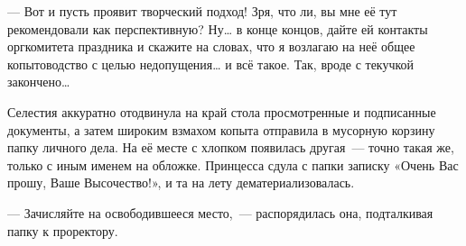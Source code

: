 \documentclass[fontsize=11pt,a5paper,titlepage=firstcover]{scrbook}
\begin{document}
--- Вот и пусть проявит творческий подход! Зря, что ли, вы мне её тут рекомендовали как перспективную? Ну{\ldots} в конце концов, дайте ей контакты оргкомитета праздника и скажите на словах, что я возлагаю на неё общее копытоводство с целью недопущения{\ldots} и всё такое. Так, вроде с текучкой закончено{\ldots}

Селестия аккуратно отодвинула на край стола просмотренные и подписанные документы, а затем широким взмахом копыта отправила в мусорную корзину папку личного дела. На её месте с хлопком появилась другая~--- точно такая же, только с иным именем на обложке. Принцесса сдула с папки записку «Очень Вас прошу, Ваше Высочество!», и та на лету дематериализовалась.

--- Зачисляйте на освободившееся место,~--- распорядилась она, подталкивая папку к проректору.
\end{document}
